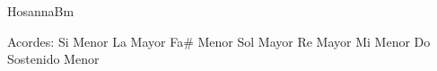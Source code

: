 \documentclass[12pt, spanish]{book}
\begin{document}
\begin{song}{Hosanna}{Bm}


        \ifChordBk
        \begin{SBOpGroup}
            Acordes:\break
            \upchord{\Bm}\qquad Si Menor \hfill
            \upchord{\A}\qquad La Mayor \hfill\null\break
            \upchord{\Fsm}\qquad Fa\# Menor \hfill
            \upchord{\G}\qquad Sol Mayor \hfill\null\break
            \upchord{\D}\qquad Re Mayor \hfill
            \upchord{\Em}\qquad Mi Menor \hfill\null\break
            \upchord{\Csm}\qquad Do Sostenido Menor \hfill\null\break
        \end{SBOpGroup}
        \fi
    \end{song}
\end{document}
